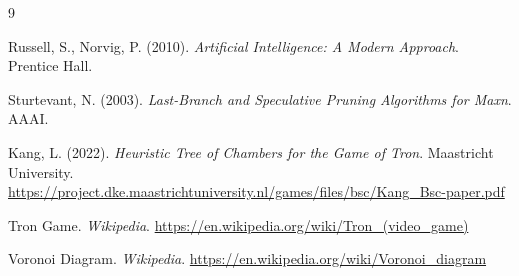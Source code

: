 \documentclass[11pt,a4paper]{article}
\begin{document}
\begin{thebibliography}{9}

Russell, S., Norvig, P. (2010). \textit{Artificial Intelligence: A Modern Approach}. Prentice Hall.

Sturtevant, N. (2003). \textit{Last-Branch and Speculative Pruning Algorithms for Maxn}. AAAI.

Kang, L. (2022). \textit{Heuristic Tree of Chambers for the Game of Tron}. Maastricht University. \url{https://project.dke.maastrichtuniversity.nl/games/files/bsc/Kang_Bsc-paper.pdf}

Tron Game. \textit{Wikipedia}. \url{https://en.wikipedia.org/wiki/Tron_(video_game)}

Voronoi Diagram. \textit{Wikipedia}. \url{https://en.wikipedia.org/wiki/Voronoi_diagram}

\end{thebibliography}
\end{document}

